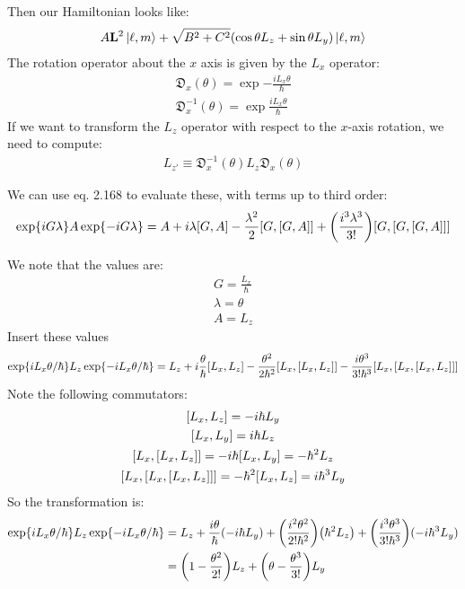 \documentclass[12pt]{article}
\begin{document}
Then our Hamiltonian looks like:
\begin{align*}
  A\vb{L}^2\ket{\ell,m}+\sqrt{B^2+C^2}(\cos\theta L_z+\sin\theta L_y)\ket{\ell,m}
\end{align*}
The rotation operator about the $x$ axis is given by the $L_x$ operator:
\begin{align*}
  \mathfrak{D}_x(\theta)=\exp{-\frac{iL_x\theta}{\hbar}}\\
  \mathfrak{D}_x^{-1}(\theta)=\exp{\frac{iL_x\theta}{\hbar}}
\end{align*}
If we want to transform the $L_z$ operator with respect to the $x$-axis rotation, we need to compute:
\begin{align*}
  L_{z'}\equiv\mathfrak{D}_x^{-1}(\theta)L_z\mathfrak{D}_x(\theta)
\end{align*}
\begin{thebook*}
We can use eq. 2.168 to evaluate these, with terms up to third order:
  \begin{align*}
    \exp{iG\lambda} A \exp{-iG\lambda}=
    A+i\lambda\comm{G}{A}-\frac{\lambda^2}{2}\comm{G}{\comm{G}{A}}
    +\qty(\frac{i^3\lambda^3}{3!})\comm{G}{\comm{G}{\comm{G}{A}}}
  \end{align*}
\end{thebook*}
We note that the values are:
\begin{gather*}
  G=\frac{L_x}{\hbar}\\
  \lambda=\theta\\
  A=L_{z}
\end{gather*}
Insert these values
\begin{align*}
  \exp{iL_x\theta/\hbar} L_z \exp{-iL_x\theta/\hbar}=
  L_z+i\frac{\theta}{\hbar}\comm{L_x}{L_z}
  -\frac{\theta^2}{2\hbar^2}\comm{L_x}{\comm{L_x}{L_z}}
  -\frac{i\theta^3}{3!\hbar^3}\comm{L_x}{\comm{L_x}{\comm{L_x}{L_z}}}
\end{align*}
Note the following commutators:
\begin{gather*}
  \comm{L_x}{L_z} = -i\hbar L_y\\
  \comm{L_x}{L_y} = i\hbar L_z\\
  \comm{L_x}{\comm{L_x}{L_z}} = -i\hbar\comm{L_x}{L_y}=-\hbar^2L_z\\
  \comm{L_x}{\comm{L_x}{\comm{L_x}{L_z}}} = -\hbar^2\comm{L_x}{L_z}=i\hbar^3L_y
\end{gather*}
So the transformation is:
\begin{align*}
  \exp{iL_x\theta/\hbar} L_z \exp{-iL_x\theta/\hbar}&=
  L_z+\frac{i\theta}{\hbar}\qty(-i\hbar L_y)
  +\qty(\frac{i^2\theta^2}{2!\hbar^2})\qty(\hbar^2L_z)
  +\qty(\frac{i^3\theta^3}{3!\hbar^3})(-i\hbar^3L_y)\\
  &=\qty(1-\frac{\theta^2}{2!})L_z+\qty(\theta-\frac{\theta^3}{3!})L_y
\end{align*}
\end{document}
